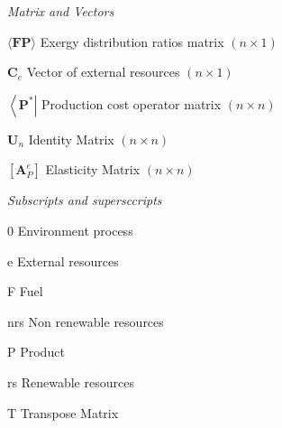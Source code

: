 \documentclass[sustainability,article,submit,moreauthors,pdftex,12pt,a4paper]{mdpi}
\newcommand{\mopcr}[1]{\ensuremath{\left\langle {\textbf{#1}^\ast } \right|}}
\newcommand{\mbr}[1]{\ensuremath{\langle \textbf{#1} \rangle}}
\newcommand{\vm}[1]{\ensuremath{\mathbf{#1}}}
\newcommand{\elm}{\ensuremath{\left[\vm{A}_P^e\right]}}
\begin{document}
\noindent\emph{Matrix and Vectors}
\begin{list}{}{
\renewcommand*{\makelabel}[1]{\hspace{\labelsep}\raggedleft #1}  
    \setlength{\labelwidth}{3em}
    \setlength{\leftmargin}{\labelwidth}
    \setlength{\parsep}{0pt}
    \setlength{\itemsep}{0pt}
    \sloppy}
    \item[\mbr{FP}] Exergy distribution ratios matrix $(n \times 1)$
    \item[$\vm{C}_e$] Vector of external resources $(n \times 1)$
    \item[\mopcr{P}] Production cost operator matrix $(n \times n)$
    \item[$\vm{U}_n$] Identity Matrix $(n \times n)$
    \item[\elm] Elasticity Matrix $(n \times n)$
\end{list}

\noindent\emph{Subscripts and supersccripts}
\begin{list}{}{
    \renewcommand*{\makelabel}[1]{\hspace{\labelsep}\raggedleft #1}  
    \setlength{\labelwidth}{3em}
    \setlength{\leftmargin}{\labelwidth}
    \setlength{\parsep}{0pt}
    \setlength{\itemsep}{0pt}
    \sloppy}
    \item[0] Environment process
    \item[e] External resources
    \item[F] Fuel
    \item[nrs] Non renewable resources
    \item[P] Product
    \item[rs] Renewable resources
    \item[T] Transpose Matrix
\end{list}
\end{document}
